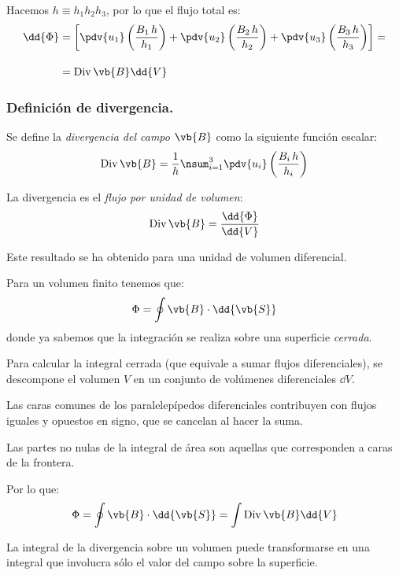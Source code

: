 Hacemos $h \equiv h_{1} h_{2} h_{3}$, por lo que el flujo total es:
\begin{align*}
\dd{\Phi} &= \left[ \pdv{u_{1}} \left( \dfrac{B_{1} \, h}{h_{1}} \right) + \pdv{u_{2}} \left( \dfrac{B_{2} \, h}{h_{2}} \right) + \pdv{u_{3}} \left( \dfrac{B_{3} \, h}{h_{3}} \right) \right] = \\[1em]
&= {\rm Div} \, \vb{B} \dd{V}
\end{align*}

\subsubsection{Definición de divergencia.}

Se define la \emph{divergencia del campo $\vb{B}$} como la siguiente función escalar:
\begin{align}
{\rm Div} \, \vb{B} = \dfrac{1}{h} \nsum_{i=1}^{3} \pdv{u_{i}} \left( \dfrac{B_{i} \, h}{h_{i}} \right)
\label{eq:ecuacion_01_30}
\end{align}

La divergencia es el \emph{flujo por unidad de volumen}:
\begin{align*}
{\rm Div} \, \vb{B} = \dfrac{\dd{\Phi}}{\dd{V}}
\end{align*}

Este resultado se ha obtenido para una unidad de volumen diferencial.
\par
Para un volumen finito tenemos que:
\begin{align*}
\Phi = \oint \vb{B} \cdot \dd{\vb{S}}
\end{align*}
donde ya sabemos que la integración se realiza sobre una superficie \emph{cerrada}.
\par
Para calcular la integral cerrada (que equivale a sumar flujos diferenciales), se descompone el volumen $V$ en un conjunto de volúmenes diferenciales $\dd{V}$.
\par
Las caras comunes de los paralelepípedos diferenciales contribuyen con flujos iguales y opuestos en signo, que se cancelan al hacer la suma.
\par
Las partes no nulas de la integral de área son aquellas que corresponden a caras de la frontera.
\par
Por lo que:
\begin{align*}
\Phi = \oint \vb{B} \cdot \dd{\vb{S}} = \int {\rm Div} \, \vb{B} \dd{V}
\end{align*}

La integral de la divergencia sobre un volumen puede transformarse en una integral que involucra sólo el valor del campo sobre la superficie.

